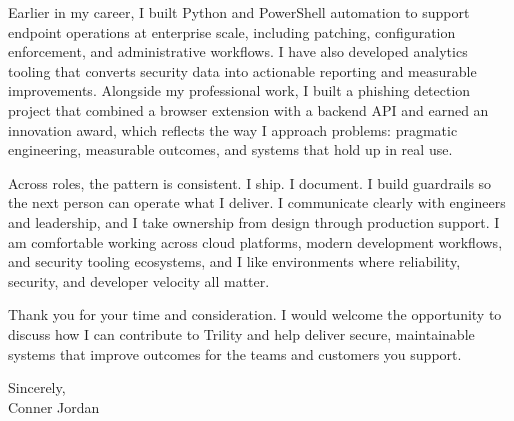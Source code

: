 \documentclass[letterpaper,11pt]{article}
\begin{document}
\vspace{16pt}

Earlier in my career, I built Python and PowerShell automation to support endpoint operations at enterprise scale, including patching, configuration enforcement, and administrative workflows. I have also developed analytics tooling that converts security data into actionable reporting and measurable improvements. Alongside my professional work, I built a phishing detection project that combined a browser extension with a backend API and earned an innovation award, which reflects the way I approach problems: pragmatic engineering, measurable outcomes, and systems that hold up in real use.

\vspace{16pt}

Across roles, the pattern is consistent. I ship. I document. I build guardrails so the next person can operate what I deliver. I communicate clearly with engineers and leadership, and I take ownership from design through production support. I am comfortable working across cloud platforms, modern development workflows, and security tooling ecosystems, and I like environments where reliability, security, and developer velocity all matter.

\vspace{16pt}

Thank you for your time and consideration. I would welcome the opportunity to discuss how I can contribute to Trility and help deliver secure, maintainable systems that improve outcomes for the teams and customers you support.

\vspace{16pt}

Sincerely,\\
Conner Jordan
\end{document}
